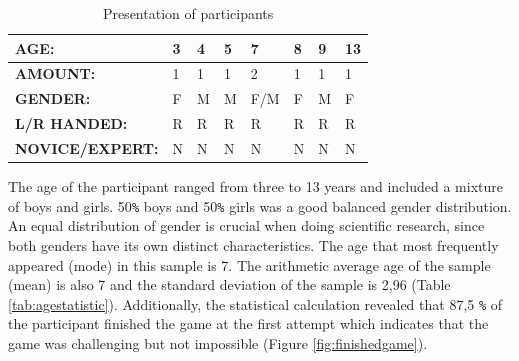 \renewcommand{\arraystretch}{1.5}
 \begin{table}[h]
     \centering
     \begin{tabular}{c|c|c|c|c|c|c|c}
     \hline
        \multicolumn{1}{|l|}{\textbf{AGE:}}  &
        \multicolumn{1}{l|}{3}  &     
        \multicolumn{1}{l|}{4}  & 
        \multicolumn{1}{l|}{5}  & 
        \multicolumn{1}{l|}{7}  & 
        \multicolumn{1}{l|}{8}  & 
        \multicolumn{1}{l|}{9}  & 
        \multicolumn{1}{l|}{13} \\ \hline
        \multicolumn{1}{|l|}{\textbf{AMOUNT:}} &
        \multicolumn{1}{l|}{1}  &
        \multicolumn{1}{l|}{1}  &
        \multicolumn{1}{l|}{1}  &
        \multicolumn{1}{l|}{2}  &
        \multicolumn{1}{l|}{1}  &
        \multicolumn{1}{l|}{1}  &
        \multicolumn{1}{l|}{1}  \\ \hline
        \multicolumn{1}{|l|}{\textbf{GENDER:}}  &
        \multicolumn{1}{|l|}{F} &
        \multicolumn{1}{l|}{M}  &
        \multicolumn{1}{l|}{M}  &
        \multicolumn{1}{l|}{F/M}&
        \multicolumn{1}{l|}{F}  &
        \multicolumn{1}{l|}{M}  &
        \multicolumn{1}{l|}{F}  \\ \hline
        \multicolumn{1}{|l|}{\textbf{L/R HANDED:}} &
        \multicolumn{1}{|l|}{R} &
        \multicolumn{1}{l|}{R}  &
        \multicolumn{1}{l|}{R}  &
        \multicolumn{1}{l|}{R}  &
        \multicolumn{1}{l|}{R}  &
        \multicolumn{1}{l|}{R}  &
        \multicolumn{1}{l|}{R}  \\ \hline
        \multicolumn{1}{|l|}{\textbf{NOVICE/EXPERT:}} &
        \multicolumn{1}{|l|}{N} &
        \multicolumn{1}{l|}{N}  &
        \multicolumn{1}{l|}{N}  &
        \multicolumn{1}{l|}{N}  &
        \multicolumn{1}{l|}{N}  &
        \multicolumn{1}{l|}{N}  &
        \multicolumn{1}{l|}{N}  \\ \hline
     \end{tabular}
     \caption{Presentation of participants}
     \label{tab:participanttable}
 \end{table}
 

The age of the participant ranged from three to 13 years and included a mixture of boys and girls. 50\texttt{\%} boys and 50\texttt{\%} girls was a good balanced gender distribution. An equal distribution of gender is crucial when doing scientific research, since both genders have its own distinct characteristics. The age that most frequently appeared (mode) in this sample is 7. The arithmetic average age of the sample (mean) is also 7 and the standard deviation of the sample is 2,96 (Table \ref{tab:agestatistic}).
Additionally, the statistical calculation revealed that 87,5 \texttt{\%} of the participant finished the game at the first attempt which indicates that the game was challenging but not impossible (Figure \ref{fig:finishedgame}). 


